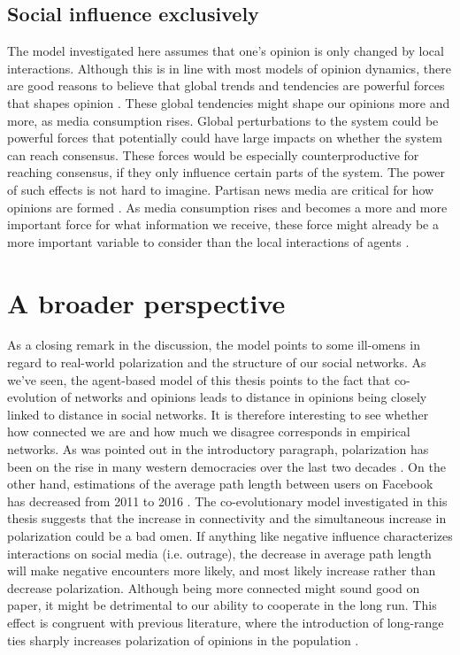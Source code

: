 \documentclass[11pt]{article}
\begin{document}
\subsection{Social influence exclusively}
The model investigated here assumes that one’s opinion is only changed by local interactions. Although this is in line with most models of opinion dynamics, there are good reasons to believe that global trends and tendencies are powerful forces that shapes opinion \cite{bener_empirical_2016}. These global tendencies might shape our opinions more and more, as media consumption rises. Global perturbations to the system could be powerful forces that potentially could have large impacts on whether the system can reach consensus. These forces would be especially counterproductive for reaching consensus, if they only influence certain parts of the system. The power of such effects is not hard to imagine. Partisan news media are critical for how opinions are formed \cite{pennycook_lazy_2019}. As media consumption rises and becomes a more and more important force for what information we receive, these force might already be a more important variable to consider than the local interactions of agents \cite{bener_empirical_2016,stromback_dynamics_2013}. 

\section{A broader perspective}
As a closing remark in the discussion, the model points to some ill-omens in regard to real-world polarization and the structure of our social networks. 
As we've seen, the agent-based model of this thesis points to the fact that co-evolution of networks and opinions leads to distance in opinions being closely linked to distance in social networks. 
It is therefore interesting to see whether how connected we are and how much we disagree corresponds in empirical networks. 
As was pointed out in the introductory paragraph, polarization has been on the rise in many western democracies over the last two decades \cite{boxell_cross-country_2020,pew_research_center_political_2014}. On the other hand, estimations of the average path length between users on Facebook has decreased from 2011 to 2016 \cite{bhagat_three_2016}. The co-evolutionary model investigated in this thesis suggests that the increase in connectivity and the simultaneous increase in polarization could be a bad omen. If anything like negative influence characterizes interactions on social media (i.e. outrage), the decrease in average path length will make negative encounters more likely, and most likely increase rather than decrease polarization. Although being more connected might sound good on paper, it might be detrimental to our ability to cooperate in the long run. This effect is congruent with previous literature, where the introduction of long-range ties sharply increases polarization of opinions in the population \cite{flache_small_2011,turner_paths_2018}.
\end{document}
